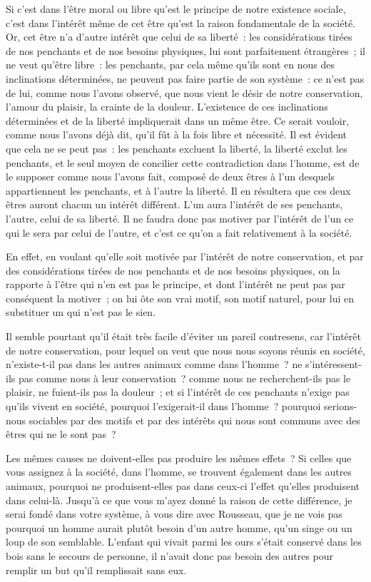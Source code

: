 \documentclass[french,twoside]{book} %
\newcommand\chaptercont{} %
\begin{document}
\chaptercont
\noindent Si c’est dans l’être moral ou libre qu’est le principe de notre existence sociale, c’est dans l’intérêt même de cet être qu’est la raison fondamentale de la société. Or, cet être n’a d’autre intérêt que celui de sa liberté : les considérations tirées de nos penchants et de nos besoins physiques, lui sont parfaitement étrangères ; il ne veut qu’être libre : les penchants, par cela même qu’ils sont en nous des inclinations déterminées, ne peuvent pas faire partie de son système : ce n’est pas de lui, comme nous l’avons observé, que nous vient le désir de notre conservation, l’amour du plaisir, la crainte de la douleur. L’existence de ces inclinations déterminées et de la liberté impliquerait dans un même être. Ce serait vouloir, comme nous l’avons déjà dit, qu’il fût à la fois libre et nécessité. Il est évident que cela ne se peut pas : les penchants excluent la liberté, la liberté exclut les penchants, et le seul moyen de concilier cette contradiction dans l’homme, est de le supposer comme nous l’avons fait, composé de deux êtres à l’un desquels appartiennent les penchants, et à l’autre la liberté. Il en résultera que ces deux êtres auront chacun un intérêt différent. L’un aura l’intérêt de ses penchants, l’autre, celui de sa liberté. Il ne faudra donc pas motiver par l’intérêt de l’un ce qui le sera par celui de l’autre, et c’est ce qu’on a fait relativement à la société.\par
En effet, en voulant qu’elle soit motivée par l’intérêt de notre conservation, et par des considérations tirées de nos penchants et de nos besoins physiques, on la rapporte à l’être qui n’en est pas le principe, et dont l’intérêt ne peut pas par conséquent la motiver ; on lui ôte son vrai motif, son motif naturel, pour lui en substituer un qui n’est pas le sien.\par
Il semble pourtant qu’il était très facile d’éviter un pareil contresens, car l’intérêt de notre conservation, pour lequel on veut que nous nous soyons réunis en société, n’existe-t-il pas dans les autres animaux comme dans l’homme ? ne s’intéressent-ils pas comme nous à leur conservation ? comme nous ne recherchent-ils pas le plaisir, ne fuient-ils pas la douleur ; et si l’intérêt de ces penchants n’exige pas qu’ils vivent en société, pourquoi l’exigerait-il dans l’homme ? pourquoi serions-nous sociables par des motifs et par des intérêts qui nous sont communs avec des êtres qui ne le sont pas ?\par
Les mêmes causes ne doivent-elles pas produire les mêmes effets ? Si celles que vous assignez à la société, dans l’homme, se trouvent également dans les autres animaux, pourquoi ne produisent-elles pas dans ceux-ci l’effet qu’elles produisent dans celui-là. Jusqu’à ce que vous m’ayez donné la raison de cette différence, je serai fondé dans votre système, à vous dire avec Rousseau, que je ne vois pas pourquoi un homme aurait plutôt besoin d’un autre homme, qu’un singe ou un loup de son semblable. L’enfant qui vivait parmi les ours s’était conservé dans les bois sans le secours de personne, il n’avait donc pas besoin des autres pour remplir un but qu’il remplissait sans eux.\par
\end{document}
